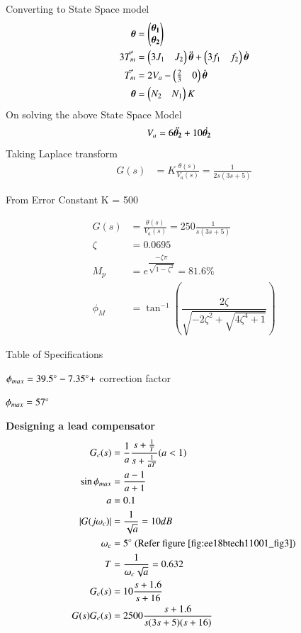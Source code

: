 Converting to State Space model
\begin{align}
    \bm{\theta} &= \begin{pmatrix}\bm{\theta_{1}} \\ \bm{\theta_{2}}\end{pmatrix}
    \\
    3 \Vec{T_{m}} &= \begin{pmatrix}3J_{1} & J_{2}\end{pmatrix}\bm{\Ddot{\theta}}+ \begin{pmatrix}3f_{1} & f_{2}\end{pmatrix}\bm{\dot{\theta}}
    \\
    \Vec{T_{m}} &= 2V_{a} - \begin{pmatrix}\frac{2}{3} & 0\end{pmatrix}\bm{\dot{\theta}}
    \\
    \bm{\theta} &= \begin{pmatrix}N_{2} & N_{1}\end{pmatrix} K
\end{align}
On solving the above State Space Model
\begin{align}
    V_{a} &= 6\bm{\Ddot{\theta_{2}}} + 10\bm{\Dot{\theta_{2}}} \label{eq:ee18btech11001_6}
\end{align}
Taking Laplace transform
\begin{align}
   G(s) &=  K \frac{\theta (s)}{V_{a}(s)} = \frac{1}{2s(3s+5)} \label{eq:ee18btech11001_7}
\end{align}

From Error Constant  K = 500

\begin{align}
   G(s) &=  \frac{\theta (s)}{V_{a}(s)} = 250 \frac{1}{s(3s+5)} \label{eq:ee18btech11001_8}
   \\
   \zeta &= 0.0695
   \\
   M_{p} &= e^{\dfrac{-\zeta\pi}{\sqrt{1-\zeta^{2}}}} = 81.6\%
   \\
   \phi_{M} &= \tan^{-1}(\dfrac{2\zeta}{\sqrt{-2\zeta^2 + \sqrt{4\zeta^4 + 1}}})
\end{align}

\begin{table}[!ht]
\centering

\caption{Table of Specifications}
\label{table:ee18btech11001}
\end{table}

$\phi_{max} = 39.5\degree-7.35\degree+$ correction factor

$\phi_{max} = 57\degree$

\textbf{Designing a lead compensator}
\begin{align}
   G_{c}(s) &=  \frac{1}{a}\frac{s + \frac{1}{T}}{s + \frac{1}{aT}} (a<1) \label{eq:ee18btech11001_9}
   \\
   \sin\phi_{max} &= \dfrac{a-1}{a+1}
   \\
   a &= 0.1
   \\
   |G(j\omega_{c})| &= \frac{1}{\sqrt{a}} = 10 dB
   \\
   \omega_{c} &= 5\degree \text{  (Refer figure \ref{fig:ee18btech11001_fig3})}
   \\
   T &= \frac{1}{\omega_{c}\sqrt{a}} = 0.632
   \\
   G_{c}(s) &=  10 \frac{s + 1.6}{s + 16}
   \\
   G(s)G_{c}(s)  &= 2500 \dfrac{s+1.6}{s(3s+5)(s+16)} \label{eq:ee18btech11001_10}
\end{align}

